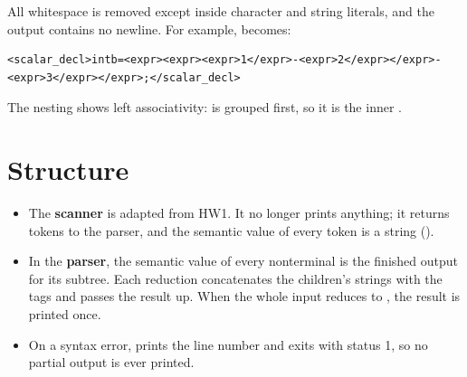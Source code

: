 \documentclass[12pt]{article}
\begin{document}
All whitespace is removed except inside character and string literals, and the output contains no
newline. For example,  becomes:

\begin{lstlisting}[language={},numbers=none]
<scalar_decl>intb=<expr><expr><expr>1</expr>-<expr>2</expr></expr>-<expr>3</expr></expr>;</scalar_decl>
\end{lstlisting}

The nesting shows left associativity:  is grouped first, so it is the inner .

\section{Structure}

\begin{center}
\end{center}

\begin{itemize}
  \item The \textbf{scanner} is adapted from HW1. It no longer prints anything; it returns tokens to the
        parser, and the semantic value of every token is a string ().
  \item In the \textbf{parser}, the semantic value of every nonterminal is the finished output for its
        subtree. Each reduction concatenates the children's strings with the tags and passes the result
        up. When the whole input reduces to , the result is printed once.
  \item On a syntax error,  prints the line number and exits with status 1, so no partial
        output is ever printed.
\end{itemize}
\end{document}

